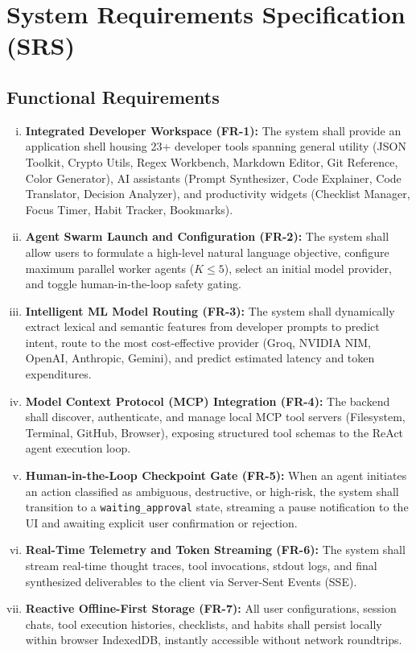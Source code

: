\documentclass[12pt,a4paper]{report}
\begin{document}
\section{System Requirements Specification (SRS)}

\subsection{Functional Requirements}
\begin{enumerate}[(i)]\setlength{\itemsep}{1.5pt}\setlength{\parsep}{0pt}\setlength{\topsep}{2pt}
    \item \textbf{Integrated Developer Workspace (FR-1):} The system shall provide an application shell housing 23+ developer tools spanning general utility (JSON Toolkit, Crypto Utils, Regex Workbench, Markdown Editor, Git Reference, Color Generator), AI assistants (Prompt Synthesizer, Code Explainer, Code Translator, Decision Analyzer), and productivity widgets (Checklist Manager, Focus Timer, Habit Tracker, Bookmarks).
    \item \textbf{Agent Swarm Launch and Configuration (FR-2):} The system shall allow users to formulate a high-level natural language objective, configure maximum parallel worker agents ($K \le 5$), select an initial model provider, and toggle human-in-the-loop safety gating.
    \item \textbf{Intelligent ML Model Routing (FR-3):} The system shall dynamically extract lexical and semantic features from developer prompts to predict intent, route to the most cost-effective provider (Groq, NVIDIA NIM, OpenAI, Anthropic, Gemini), and predict estimated latency and token expenditures.
    \item \textbf{Model Context Protocol (MCP) Integration (FR-4):} The backend shall discover, authenticate, and manage local MCP tool servers (Filesystem, Terminal, GitHub, Browser), exposing structured tool schemas to the ReAct agent execution loop.
    \item \textbf{Human-in-the-Loop Checkpoint Gate (FR-5):} When an agent initiates an action classified as ambiguous, destructive, or high-risk, the system shall transition to a \texttt{waiting\_approval} state, streaming a pause notification to the UI and awaiting explicit user confirmation or rejection.
    \item \textbf{Real-Time Telemetry and Token Streaming (FR-6):} The system shall stream real-time thought traces, tool invocations, stdout logs, and final synthesized deliverables to the client via Server-Sent Events (SSE).
    \item \textbf{Reactive Offline-First Storage (FR-7):} All user configurations, session chats, tool execution histories, checklists, and habits shall persist locally within browser IndexedDB, instantly accessible without network roundtrips.
\end{enumerate}
\end{document}

